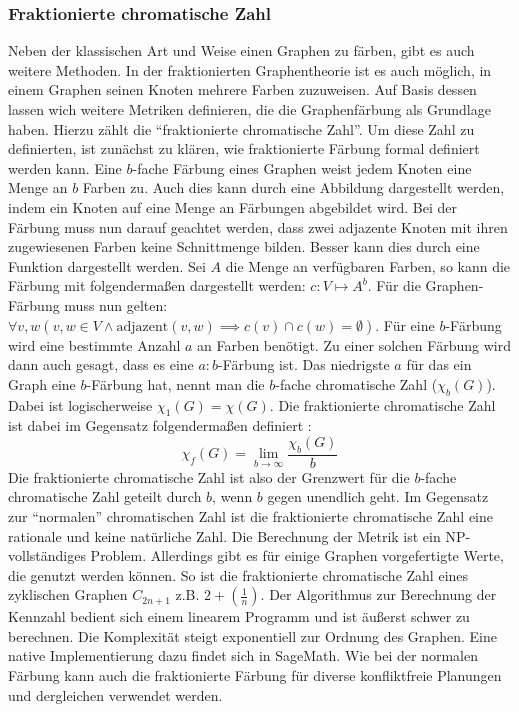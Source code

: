 \documentclass[a4paper,12pt,ngerman,chapterprefix=false,listof=totoc,bibliography=totoc]{scrreprt}
\begin{document}
\subsubsection*{Fraktionierte chromatische Zahl}
{
Neben der klassischen Art und Weise einen Graphen zu färben, gibt es auch weitere Methoden. In der fraktionierten Graphentheorie ist es auch möglich, in einem Graphen seinen Knoten mehrere Farben zuzuweisen. Auf Basis dessen lassen wich weitere Metriken definieren, die die Graphenfärbung als Grundlage haben. Hierzu zählt die "`fraktionierte chromatische Zahl"'. Um diese Zahl zu definierten, ist zunächst zu klären, wie fraktionierte Färbung formal definiert werden kann. Eine \(b\)-fache Färbung eines Graphen weist jedem Knoten eine Menge an \(b\) Farben zu. Auch dies kann durch eine Abbildung dargestellt werden, indem ein Knoten auf eine Menge an Färbungen abgebildet wird. Bei der Färbung muss nun darauf geachtet werden, dass zwei adjazente Knoten mit ihren zugewiesenen Farben keine Schnittmenge bilden. Besser kann dies durch eine Funktion dargestellt werden. Sei \(A\) die Menge an verfügbaren Farben, so kann die Färbung mit folgendermaßen dargestellt werden: \(c: V\mapsto A^b\). Für die Graphen-Färbung muss nun gelten: \(\forall v,w(v,w\in V\land \text{adjazent}(v,w)\implies c(v)\cap c(w)=\emptyset)\). Für eine \(b\)-Färbung wird eine bestimmte Anzahl \(a\) an Farben benötigt. Zu einer solchen Färbung wird dann auch gesagt, dass es eine \(a:b\)-Färbung ist. Das niedrigste \(a\) für das ein Graph eine \(b\)-Färbung hat, nennt man die \(b\)-fache chromatische Zahl (\(\chi _b(G)\)). Dabei ist logischerweise \(\chi_1(G) = \chi (G)\). Die fraktionierte chromatische Zahl ist dabei im Gegensatz folgendermaßen definiert \cite{scheinerman_fractional_2011}:
\[\chi_f(G)=\lim_{b\to\infty}\frac{\chi_b(G)}{b}\]
Die fraktionierte chromatische Zahl ist also der Grenzwert für die \(b\)-fache chromatische Zahl geteilt durch \(b\), wenn \(b\) gegen unendlich geht. Im Gegensatz zur "`normalen"' chromatischen Zahl ist die fraktionierte chromatische Zahl eine rationale und keine natürliche Zahl. Die Berechnung der Metrik ist ein NP-vollständiges Problem. Allerdings gibt es für einige Graphen vorgefertigte Werte, die genutzt werden können. So ist die fraktionierte chromatische Zahl eines zyklischen Graphen \(C_{2n+1}\) z.B. \(2+(\frac{1}{n})\). Der Algorithmus zur Berechnung der Kennzahl bedient sich einem linearem Programm und ist äußerst schwer zu berechnen. Die Komplexität steigt exponentiell zur Ordnung des Graphen. Eine native Implementierung dazu findet sich in SageMath. Wie bei der normalen Färbung kann auch die fraktionierte Färbung für diverse konfliktfreie Planungen und dergleichen verwendet werden. \cite{weisstein_chromatic_nodate,sagemath_graph_2020-1,scheinerman_fractional_2011}
}
\end{document}

